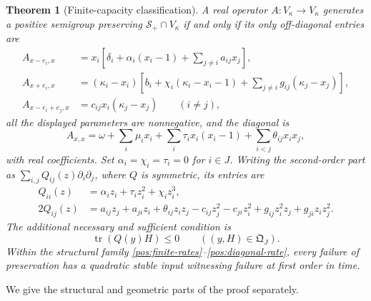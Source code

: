 \documentclass[reqno]{amsart}
\newtheorem{theorem}{Theorem}[section]
\theoremstyle{definition}
\theoremstyle{remark}
\begin{document}
\begin{theorem}[Finite-capacity classification]\label{pos:finite}
A real operator \(A:V_\kappa\to V_\kappa\) generates a positive semigroup preserving
\(\mathcal S_+\cap V_\kappa\) if and only if its only off-diagonal entries are
\begin{equation}\label{pos:finite-rates}
\begin{aligned}
 A_{x-e_i,x}&=x_i\left[\delta_i+\alpha_i(x_i-1)
                         +\sum_{j\ne i}a_{ij}x_j\right],\\
 A_{x+e_i,x}&=(\kappa_i-x_i)\left[b_i+\chi_i(\kappa_i-x_i-1)
                         +\sum_{j\ne i}g_{ij}(\kappa_j-x_j)\right],\\
 A_{x-e_i+e_j,x}&=c_{ij}x_i(\kappa_j-x_j)\qquad(i\ne j),
\end{aligned}
\end{equation}
all the displayed parameters are nonnegative, and the diagonal is
\begin{equation}\label{pos:diagonal-rate}
 A_{x,x}=\omega+\sum_i\mu_ix_i+\sum_i\tau_ix_i(x_i-1)
                      +\sum_{i<j}\theta_{ij}x_ix_j,
\end{equation}
with real coefficients.  Set \(\alpha_i=\chi_i=\tau_i=0\) for \(i\in J\).
Writing the second-order part as \(\sum_{i,j}Q_{ij}(z)\partial_i\partial_j\),
where \(Q\) is symmetric, its entries are
\begin{equation}\label{pos:principal-matrix}
\begin{aligned}
 Q_{ii}(z)&=\alpha_i z_i+\tau_i z_i^2+\chi_i z_i^3,\\
 2Q_{ij}(z)&=a_{ij}z_j+a_{ji}z_i+\theta_{ij}z_iz_j
 -c_{ij}z_j^2-c_{ji}z_i^2
 +g_{ij}z_i^2z_j+g_{ji}z_iz_j^2.
\end{aligned}
\end{equation}
The additional necessary and sufficient condition is
\begin{equation}\label{pos:contact-test}
 \operatorname{tr}(Q(y)H)\le0\qquad((y,H)\in\mathfrak Q_J).
\end{equation}
Within the structural family \eqref{pos:finite-rates}--\eqref{pos:diagonal-rate},
every failure of preservation has a quadratic stable input witnessing failure
at first order in time.
\end{theorem}

We give the structural and geometric parts of the proof separately.
\end{document}
